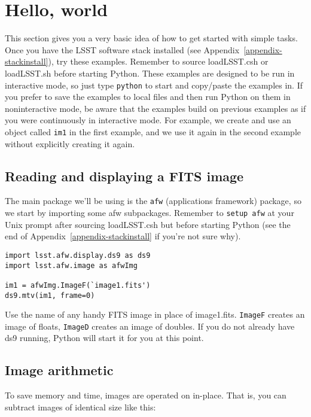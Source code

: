 \documentclass{book}
\def\t{\texttt}
\begin{document}
\chapter{Hello, world\label{chap-hello}}

This section gives you a very basic idea of how to get started with
simple tasks.  Once you have the LSST software stack installed (see
Appendix~\ref{appendix-stackinstall}), try these examples.  Remember
to source loadLSST.csh or loadLSST.sh before starting Python.  These
examples are designed to be run in interactive mode, so just type
\texttt{python} to start and copy/paste the examples in.  If you
prefer to save the examples to local files and then run Python on them
in noninteractive mode, be aware that the examples build on previous
examples as if you were continuously in interactive mode.  For
example, we create and use an object called \texttt{im1} in the first
example, and we use it again in the second example without explicitly
creating it again.


\section{Reading and displaying a FITS image}

The main package we'll be using is the \texttt{afw} (applications
framework) package, so we start by importing some afw subpackages.
Remember to \t{setup afw} at your Unix prompt after sourcing
loadLSST.csh but before starting Python (see the end of
Appendix~\ref{appendix-stackinstall} if you're not sure why).

\begin{verbatim}
import lsst.afw.display.ds9 as ds9
import lsst.afw.image as afwImg

im1 = afwImg.ImageF(`image1.fits')
ds9.mtv(im1, frame=0)
\end{verbatim}

Use the name of any handy FITS image in place of image1.fits.
\texttt{ImageF} creates an image of floats, \texttt{ImageD} creates an
image of doubles.  If you do not already have ds9 running, Python will
start it for you at this point.

\section{Image arithmetic}

To save memory and time, images are operated on in-place.  That is,
you can subtract images of identical size like this:
\end{document}
